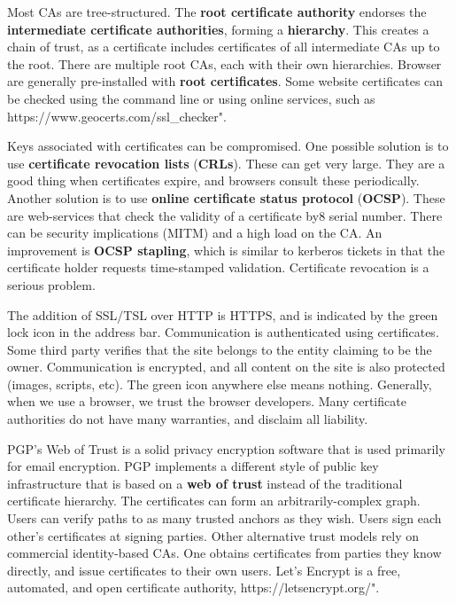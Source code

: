 \documentclass[11pt]{article}
\theoremstyle{plain} %
\theoremstyle{definition}
\theoremstyle{example}
\theoremstyle{remark}
\def\url#1{\expandafter\string\csname #1\endcsname}
\begin{document}
Most CAs are tree-structured. The \textbf{root certificate authority} endorses the \textbf{intermediate certificate authorities}, forming a \textbf{hierarchy}. This creates a chain of trust, as a certificate includes certificates of all intermediate CAs up to the root. There are multiple root CAs, each with their own hierarchies. Browser are generally pre-installed with \textbf{root certificates}. Some website certificates can be checked using the command line or using online services, such as \url{https://www.geocerts.com/ssl_checker}".

Keys associated with certificates can be compromised. One possible solution is to use \textbf{certificate revocation lists} (\textbf{CRLs}). These can get very large. They are a good thing when certificates expire, and browsers consult these periodically. Another solution is to use \textbf{online certificate status protocol} (\textbf{OCSP}). These are web-services that check the validity of a certificate by8 serial number. There can be security implications (MITM) and a high load on the CA. An improvement is \textbf{OCSP stapling}, which is similar to kerberos tickets in that the certificate holder requests time-stamped validation. Certificate revocation is a serious problem. 

The addition of SSL/TSL over HTTP is HTTPS, and is indicated by the green lock icon in the address bar. Communication is authenticated using certificates. Some third party verifies that the site belongs to the entity claiming to be the owner. Communication is encrypted, and all content on the site is also protected (images, scripts, etc). The green icon anywhere else means nothing. Generally, when we use a browser, we trust the browser developers. Many certificate authorities do not have many warranties, and disclaim all liability. 

PGP's Web of Trust is a solid privacy encryption software that is used primarily for email encryption. PGP implements a different style of public key infrastructure that is based on a \textbf{web of trust} instead of the traditional certificate hierarchy. The certificates can form an arbitrarily-complex graph. Users can verify paths to as many trusted anchors as they wish. Users sign each other's certificates at signing parties. Other alternative trust models rely on commercial identity-based CAs. One obtains certificates from parties they know directly, and issue certificates to their own users. Let's Encrypt is a free, automated, and open certificate authority, \url{https://letsencrypt.org/}".
\end{document}
